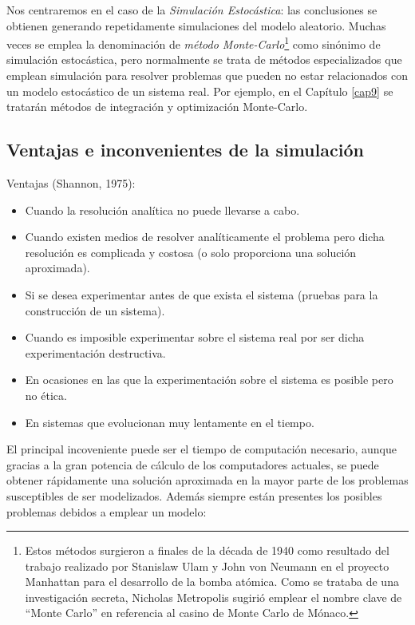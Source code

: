 \documentclass[
]{book}
\theoremstyle{break}
\theoremstyle{definition}
\theoremstyle{definition}
\theoremstyle{definition}
\theoremstyle{remark}
\begin{document}
Nos centraremos en el caso de la \emph{Simulación Estocástica}: las conclusiones se obtienen generando repetidamente simulaciones del modelo aleatorio.
Muchas veces se emplea la denominación de \emph{método Monte-Carlo}\footnote{Estos métodos surgieron a finales de la década de 1940 como resultado del trabajo realizado por Stanislaw Ulam y John von Neumann en el proyecto Manhattan para el desarrollo de la bomba atómica. Como se trataba de una investigación secreta, Nicholas Metropolis sugirió emplear el nombre clave de ``Monte Carlo'' en referencia al casino de Monte Carlo de Mónaco.} como sinónimo de simulación estocástica, pero normalmente se trata de métodos especializados que emplean simulación para resolver problemas que pueden no estar relacionados con un modelo estocástico de un sistema real. Por ejemplo, en el Capítulo \ref{cap9} se tratarán métodos de integración y optimización Monte-Carlo.

\hypertarget{ventajas-e-inconvenientes-de-la-simulaciuxf3n}{%
\subsection{Ventajas e inconvenientes de la simulación}\label{ventajas-e-inconvenientes-de-la-simulaciuxf3n}}

Ventajas (Shannon, 1975):

\begin{itemize}
\item
  Cuando la resolución analítica no puede llevarse a cabo.
\item
  Cuando existen medios de resolver analíticamente el problema
  pero dicha resolución es complicada y costosa
  (o solo proporciona una solución aproximada).
\item
  Si se desea experimentar antes de que exista el sistema
  (pruebas para la construcción de un sistema).
\item
  Cuando es imposible experimentar sobre el sistema real
  por ser dicha experimentación destructiva.
\item
  En ocasiones en las que la experimentación sobre el sistema es
  posible pero no ética.
\item
  En sistemas que evolucionan muy lentamente en el tiempo.
\end{itemize}

El principal incoveniente puede ser el tiempo de computación necesario, aunque gracias a la gran potencia de cálculo de los computadores actuales, se puede obtener rápidamente una solución aproximada en la mayor parte de los problemas susceptibles de ser modelizados.
Además siempre están presentes los posibles problemas debidos a emplear un modelo:
\end{document}
